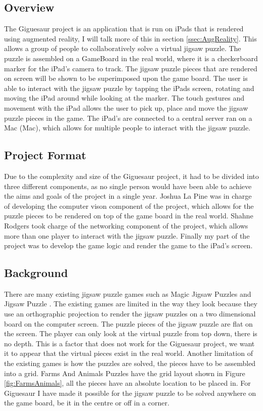 \documentclass{article}
\begin{document}
\subsection{Overview}
The Giguesaur project is an application that is run on iPads that is rendered
using augmented reality, I will talk more of this in section
\ref{ssec:AugReality}. This allows a group of people to collaboratively solve a
virtual jigsaw puzzle. The puzzle is assembled on a \gls{GameBoard} in the real
world, where it is a checkerboard marker for the iPad's camera to track. The
jigsaw puzzle pieces that are rendered on screen will be shown to be
superimposed upon the game board. The user is able to interact with the jigsaw
puzzle by tapping the iPads screen, rotating and moving the iPad around while
looking at the marker. The touch gestures and movement with the iPad allows the
user to pick up, place and move the jigsaw puzzle pieces in the game. The iPad's
are connected to a central server ran on a \gls{Mac} (Mac), which allows for
multiple people to interact with the jigsaw puzzle.

\subsection{Project Format}
Due to the complexity and size of the Giguesaur project, it had to be divided
into three different components, as no single person would have been able to
achieve the aims and goals of the project in a single year. Joshua La Pine was
in charge of developing the computer vison component of the project, which
allows for the puzzle pieces to be rendered on top of the game board in the real
world. Shahne Rodgers took charge of the networking component of the project,
which allows more than one player to interact with the jigsaw puzzle. Finally my
part of the project was to develop the game logic and render the game to the
iPad's screen.

\subsection{Background}
There are many existing jigsaw puzzle games such as Magic Jigsaw Puzzles
\cite{ref:MagicJigsaw} and Jigsaw Puzzle \cite{ref:JigsawPuzzle}. The existing
games are limited in the way they look because they use an orthographic
projection to render the jigsaw puzzles on a two dimensional board on the
computer screen. The puzzle pieces of the jigsaw puzzle are flat on the
screen. The player can only look at the virtual puzzle from top down, there is
no depth. This is a factor that does not work for the Giguesaur project, we want
it to appear that the virtual pieces exist in the real world. Another limitation
of the existing games is how the puzzles are solved, the pieces have to be
assembled into a grid. Farms And Animals Puzzles \cite{ref:FarmPuzzle} have the
grid layout shown in Figure \ref{fig:FarmsAnimals}, all the pieces have an
absolute location to be placed in. For Giguesaur I have made it possible for the
jigsaw puzzle to be solved anywhere on the game board, be it in the centre or
off in a corner.
\end{document}
